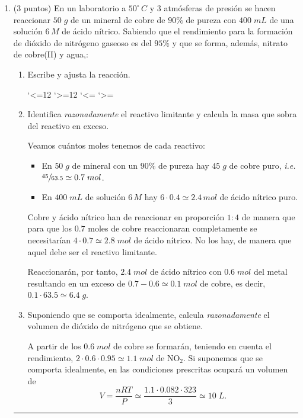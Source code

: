 \documentclass[a4paper,14pt]{extarticle}
\let\chold\ch
\renewcommand\ch[1]{%
    \catcode`<=12
    \catcode`>=12
    \chold{#1}%
    \catcode`<=\active
    \catcode`>=\active
}
\newcommand*\chem[1]{\ensuremath{\mathrm{#1}}}
\newcommand{\halmos}{
\vspace*{-1ex}

\begin{flushright}
\rule{1mm}{2.5mm} \end{flushright}
\vspace*{-1.5ex}

}
\renewcommand{\qed}{\halmos}
\begin{document}
\begin{enumerate}
    \item (3 puntos) En un laboratorio a $50^\circ\,C$ y $3$ atmósferas de presión se hacen reaccionar $50\;g$ de un mineral de cobre de $90\%$ de pureza con $400\;mL$ de una solución $6\,M$ de ácido nítrico. Sabiendo que el rendimiento para la formación de dióxido de nitrógeno gaseoso es del $95\%$ y que se forma, además, nitrato de cobre{\small (II)} y agua,:
    	\begin{enumerate}[label=\alph*)]
    		\item Escribe y ajusta la reacción.
    		\begin{mdframed}[backgroundcolor=brown!10]  
    		\end{mdframed}
    		\item Identifica \textit{razonadamente }el reactivo limitante y calcula la masa que sobra del reactivo en exceso.
    		\begin{mdframed}[backgroundcolor=brown!10]  
    		Veamos cuántos moles tenemos de cada reactivo: 
    		\begin{itemize}
    			\item En $50\;g$ de mineral con un $90\%$ de pureza hay $45\;g$ de cobre puro, \textit{i.e.} $\sfrac{45}{63.5}\simeq 0.7\;mol$.
    			\item En $400\;mL$ de solución $6\,M$ hay $6\cdot 0.4\simeq 2.4\,mol$ de ácido nítrico puro.
    		\end{itemize}
    		Cobre y ácido nítrico han de reaccionar en proporción $1:4$ de manera que para que los $0.7$ moles de cobre reaccionaran completamente se necesitarían $4\cdot 0.7\simeq 2.8\;mol$ de ácido nítrico. No los hay, de manera que aquel debe ser el reactivo limitante.
    		\vspace{1ex}
    		
    		Reaccionarán, por tanto, $2.4\;mol$ de ácido nítrico con $0.6\;mol$ del metal resultando en un exceso de $0.7-0.6\simeq 0.1\;mol$ de cobre, es decir, $0.1\cdot 63.5\simeq 6.4\;g$.
    		\end{mdframed}
    		\item Suponiendo que se comporta idealmente, calcula \textit{razonadamente} el volumen de dióxido de nitrógeno que se obtiene.
    		\begin{mdframed}[backgroundcolor=brown!10]  
    		A partir de los $0.6\;mol$ de cobre se formarán, teniendo en cuenta el rendimiento, $2\cdot 0.6\cdot 0.95\simeq 1.1\;mol$ de $\chem{NO_2}$. Si suponemos que se comporta idealmente, en las condiciones prescritas ocupará un volumen de
    		\[V=\frac{nRT}{P}\simeq\frac{1.1\cdot 0.082\cdot 323}{3}\simeq 10\;L.\]
    		\end{mdframed}
    	\end{enumerate}
  	\qed
  	

\end{enumerate}
\end{document}
